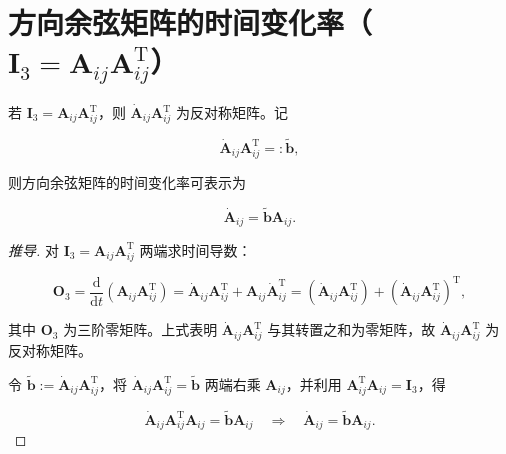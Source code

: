 \section{方向余弦矩阵的时间变化率（\texorpdfstring{$\boldsymbol{I}_3=\boldsymbol{A}_{ij}\boldsymbol{A}_{ij}^{\mathrm{T}}$}{I_3=AijAijT}）}
\begin{theorem}
若 $\boldsymbol{I}_3=\boldsymbol{A}_{ij}\boldsymbol{A}_{ij}^{\mathrm{T}}$，则 $\dot{\boldsymbol{A}}_{ij}\boldsymbol{A}_{ij}^{\mathrm{T}}$ 为反对称矩阵。记

\[
\dot{\boldsymbol{A}}_{ij}\boldsymbol{A}_{ij}^{\mathrm{T}}=:\tilde{\boldsymbol{b}},
\]

则方向余弦矩阵的时间变化率可表示为

\[
\dot{\boldsymbol{A}}_{ij}=\tilde{\boldsymbol{b}}\boldsymbol{A}_{ij}.
\]
\end{theorem}
\begin{proof}[推导]
对 $\boldsymbol{I}_3=\boldsymbol{A}_{ij}\boldsymbol{A}_{ij}^{\mathrm{T}}$ 两端求时间导数：

\[
\boldsymbol{O}_3=\frac{\mathrm{d}}{\mathrm{d}t}\left(\boldsymbol{A}_{ij}\boldsymbol{A}_{ij}^{\mathrm{T}}\right)
=\dot{\boldsymbol{A}}_{ij}\boldsymbol{A}_{ij}^{\mathrm{T}}+\boldsymbol{A}_{ij}\dot{\boldsymbol{A}}_{ij}^{\mathrm{T}}
=\left(\dot{\boldsymbol{A}}_{ij}\boldsymbol{A}_{ij}^{\mathrm{T}}\right)+\left(\dot{\boldsymbol{A}}_{ij}\boldsymbol{A}_{ij}^{\mathrm{T}}\right)^{\mathrm{T}},
\]

其中 $\boldsymbol{O}_3$ 为三阶零矩阵。上式表明 $\dot{\boldsymbol{A}}_{ij}\boldsymbol{A}_{ij}^{\mathrm{T}}$ 与其转置之和为零矩阵，故 $\dot{\boldsymbol{A}}_{ij}\boldsymbol{A}_{ij}^{\mathrm{T}}$ 为反对称矩阵。

令 $\tilde{\boldsymbol{b}}:=\dot{\boldsymbol{A}}_{ij}\boldsymbol{A}_{ij}^{\mathrm{T}}$，将 $\dot{\boldsymbol{A}}_{ij}\boldsymbol{A}_{ij}^{\mathrm{T}}=\tilde{\boldsymbol{b}}$ 两端右乘 $\boldsymbol{A}_{ij}$，并利用 $\boldsymbol{A}_{ij}^{\mathrm{T}}\boldsymbol{A}_{ij}=\boldsymbol{I}_3$，得

\[
\dot{\boldsymbol{A}}_{ij}\boldsymbol{A}_{ij}^{\mathrm{T}}\boldsymbol{A}_{ij}=\tilde{\boldsymbol{b}}\boldsymbol{A}_{ij}
\quad\Longrightarrow\quad
\dot{\boldsymbol{A}}_{ij}=\tilde{\boldsymbol{b}}\boldsymbol{A}_{ij}.
\]
\end{proof}
